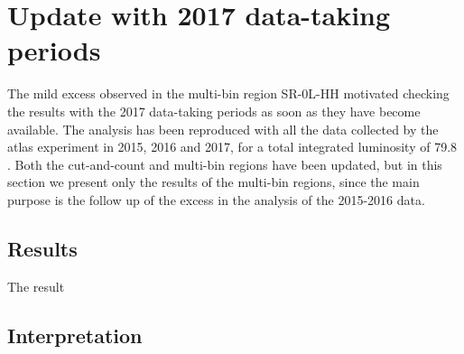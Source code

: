 \section{Update with 2017 data-taking periods}
\label{sec:strong:r21}

The mild excess observed in the multi-bin region SR-0L-HH motivated checking the results with the 2017 data-taking periods 
as soon as they have become available. 
The analysis has been reproduced with all the data collected by the \gls{atlas} experiment in 2015, 2016 and 2017, 
for a total integrated luminosity of 79.8 \ifb. 
Both the cut-and-count and multi-bin regions have been updated, but in this section we present only the results 
of the multi-bin regions, since the main purpose is the follow up of the excess in the analysis of the 2015-2016 data.


\subsection{Results}
The result 

\subsection{Interpretation}